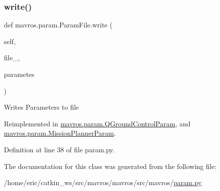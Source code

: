 \subsubsection{\texorpdfstring{write()}{write()}}
{\footnotesize\ttfamily def mavros.\+param.\+Param\+File.\+write (\begin{DoxyParamCaption}\item[{}]{self,  }\item[{}]{file\+\_\+,  }\item[{}]{parametes }\end{DoxyParamCaption})}

\begin{DoxyVerb}Writes Parameters to file\end{DoxyVerb}
 

Reimplemented in \mbox{\hyperlink{classmavros_1_1param_1_1QGroundControlParam_aa0d9f027320486aca9bbbe696c3fd994}{mavros.\+param.\+Q\+Ground\+Control\+Param}}, and \mbox{\hyperlink{classmavros_1_1param_1_1MissionPlannerParam_accdcc5b51babb10e3212241d71587210}{mavros.\+param.\+Mission\+Planner\+Param}}.



Definition at line 38 of file param.\+py.



The documentation for this class was generated from the following file\+:\begin{DoxyCompactItemize}
\item 
/home/eric/catkin\+\_\+ws/src/mavros/mavros/src/mavros/\mbox{\hyperlink{param_8py}{param.\+py}}\end{DoxyCompactItemize}

